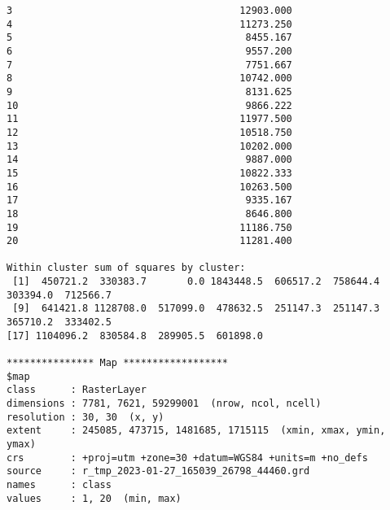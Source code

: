 \begin{scriptsize}
\begin{verbatim}
3                                       12903.000
4                                       11273.250
5                                        8455.167
6                                        9557.200
7                                        7751.667
8                                       10742.000
9                                        8131.625
10                                       9866.222
11                                      11977.500
12                                      10518.750
13                                      10202.000
14                                       9887.000
15                                      10822.333
16                                      10263.500
17                                       9335.167
18                                       8646.800
19                                      11186.750
20                                      11281.400

Within cluster sum of squares by cluster:
 [1]  450721.2  330383.7       0.0 1843448.5  606517.2  758644.4  303394.0  712566.7
 [9]  641421.8 1128708.0  517099.0  478632.5  251147.3  251147.3  365710.2  333402.5
[17] 1104096.2  830584.8  289905.5  601898.0

*************** Map ******************
$map
class      : RasterLayer 
dimensions : 7781, 7621, 59299001  (nrow, ncol, ncell)
resolution : 30, 30  (x, y)
extent     : 245085, 473715, 1481685, 1715115  (xmin, xmax, ymin, ymax)
crs        : +proj=utm +zone=30 +datum=WGS84 +units=m +no_defs 
source     : r_tmp_2023-01-27_165039_26798_44460.grd 
names      : class 
values     : 1, 20  (min, max)
\end{verbatim}
\end{scriptsize}